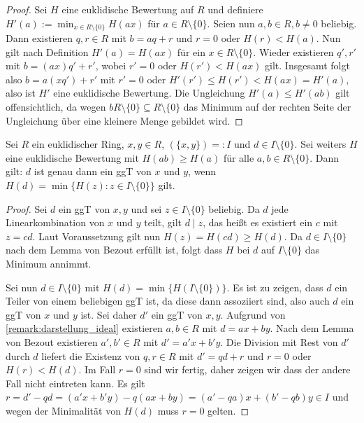 \begin{proof}
    Sei $H$ eine euklidische Bewertung auf $R$ und definiere $H'(a):=\min_{x\in R\setminus\{0\}}H(ax)$ für $a\in R\setminus\{0\}$. Seien nun $a,b\in R, b\neq 0$ beliebig. Dann existieren $q,r\in R$ mit $b=aq+r$ und $r=0$ oder $H(r)<H(a)$. Nun gilt nach Definition $H'(a)=H(ax)$ für ein $x\in R\setminus\{0\}$. Wieder existieren $q',r'$ mit $b=(ax)q'+r'$, wobei $r'=0$ oder $H(r')<H(ax)$ gilt. Insgesamt folgt also $b=a(xq')+r'$ mit $r'=0$ oder $H'(r')\leq H(r')< H(ax) = H'(a)$, also ist $H'$ eine euklidische Bewertung. Die Ungleichung $H'(a)\le H'(ab)$ gilt offensichtlich, da wegen $bR\setminus\{0\}\subseteq R\setminus\{0\}$ das Minimum auf der rechten Seite der Ungleichung über eine kleinere Menge gebildet wird.
\end{proof}

\begin{lemma}\label{lemma:minimaliaet_ggt_als_linearkombination}
    Sei $R$ ein euklidischer Ring, $x,y\in R$, $(\{x,y\})=:I$ und $d\in I\setminus\{0\}$. Sei weiters $H$ eine euklidische Bewertung mit $H(ab)\geq H(a)$ für alle $a,b\in R\setminus\{0\}$. Dann gilt: $d$ ist genau dann ein ggT von $x$ und $y$, wenn $H(d)=\min\{H(z):z\in I\setminus\{0\}\}$ gilt.
\end{lemma}

\begin{proof}
    Sei $d$ ein ggT von $x,y$ und sei $z\in I\setminus\{0\}$ beliebig. Da $d$ jede Linearkombination von $x$ und $y$ teilt, gilt $d\mid z$, das heißt es existiert ein $c$ mit $z=cd$. Laut Voraussetzung gilt nun $H(z)=H(cd)\geq H(d)$. Da $d\in I\setminus\{0\}$ nach dem Lemma von Bezout erfüllt ist, folgt
    dass $H$ bei $d$ auf $I\setminus\{0\}$ das Minimum annimmt.

    Sei nun $d\in I\setminus\{0\}$ mit $H(d)=\min\{H(I\setminus\{0\})\}$. Es ist zu zeigen, dass $d$ ein Teiler von einem beliebigen ggT ist, da diese dann assoziiert sind, also auch $d$ ein ggT von $x$ und $y$ ist. Sei daher $d'$ ein ggT von $x,y$. Aufgrund von \cref{remark:darstellung_ideal} existieren $a,b\in R$ mit $d=ax+by$. Nach dem Lemma von Bezout existieren $a',b'\in R$ mit $d'=a'x+b'y$. Die Division mit Rest von $d'$ durch $d$ liefert die Existenz von $q,r\in R$ mit $d'=qd+r$ und $r=0$ oder $H(r)<H(d)$. Im Fall $r=0$ sind wir fertig, daher zeigen wir dass der andere Fall nicht eintreten kann. Es gilt
    $r=d'-qd=(a'x+b'y)-q(ax+by)=(a'-qa)x+(b'-qb)y\in I$ und wegen der Minimalität von $H(d)$ muss $r=0$
    gelten.
\end{proof}

